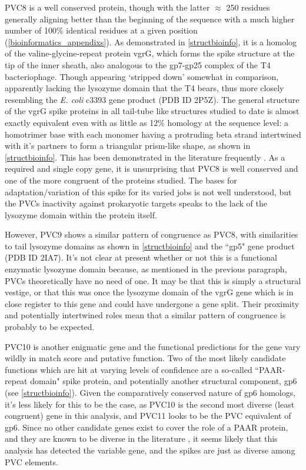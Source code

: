 PVC8 is a well conserved protein, though with the latter $\approx$ 250 residues generally aligning better than the beginning of the sequence with a much higher number of 100\% identical residues at a given position (\vref{bioinformatics_appendixs}). As demonstrated in \vref{structbioinfo}, it is a homolog of the valine-glycine-repeat protein vgrG, which forms the spike structure at the tip of the inner sheath, also analogous to the gp7-gp25 complex of the T4 bacteriophage. Though appearing `stripped down' somewhat in comparison, apparently lacking the lysozyme domain that the T4 bears, thus more closely resembling the \emph{E. coli} c3393 gene product (PDB ID 2P5Z). The general structure of the vgrG spike proteins in all tail-tube like structures studied to date is almost exactly equivalent even with as little as 12\% homology at the sequence level: a homotrimer base with each monomer having a protruding beta strand intertwined with it's partners to form a triangular prism-like shape, as shown in \vref{structbioinfo}. This has been demonstrated in the literature frequently \citep{Leiman2009}. As a required and single copy gene, it is unsurprising that PVC8 is well conserved and one of the more congruent of the proteins studied. The bases for adaptation/variation of this spike for its varied jobs is not well understood, but the PVCs inactivity against prokaryotic targets speaks to the lack of the lysozyme domain within the protein itself.

However, PVC9 shows a similar pattern of congruence as PVC8, with similarities to tail lysozyme domains as shown in \vref{structbioinfo} \citep{Arisaka2003} and the ``gp5" gene product (PDB ID 2IA7). It's not clear at present whether or not this is a functional enzymatic lysozyme domain because, as mentioned in the previous paragraph, PVCs theoretically have no need of one. It may be that this is simply a structural vestige, or that this was once the lysozyme domain of the vgrG gene which is in close register to this gene and could have undergone a gene split. Their proximity and potentially intertwined roles mean that a similar pattern of congruence is probably to be expected.

PVC10 is another enigmatic gene and the functional predictions for the gene vary wildly in match score and putative function. Two of the most likely candidate functions which are hit at varying levels of confidence are a so-called ``PAAR-repeat domain" spike protein, and potentially another structural component, gp6 (see \vref{structbioinfo}). Given the comparatively conserved nature of gp6 homologs, it's less likely for this to be the case, as PVC10 is the second most diverse (least congruent) gene in this analysis, and PVC11 looks to be the PVC equivalent of gp6. Since no other candidate genes exist to cover the role of a PAAR protein, and they are known to be diverse in the literature \citep{Shneider2013}, it seems likely that this analysis has detected the variable gene, and the spikes are just as diverse among PVC elements.

